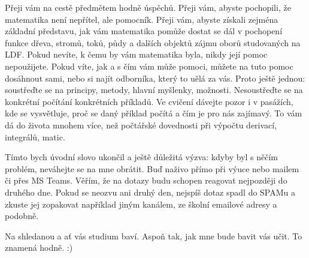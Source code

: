 \documentclass[12pt]{article}
\begin{document}
Přeji vám na cestě předmětem hodně úspěchů. Přeji vám, abyste pochopili, že matematika není nepřítel, ale pomocník. Přeji vám, abyste získali zejména základní představu, jak vám matematika pomůže dostat se dál v pochopení funkce dřeva, stromů, toků, půdy a dalších objektů zájmu oborů studovaných na LDF. Pokud nevíte, k čemu by vám matematika byla, nikdy její pomoc nepoužijete. Pokud víte, jak a s čím vám může pomoci, můžete na tuto pomoc dosáhnout sami, nebo si najít odborníka, který to uělá za vás. Proto ještě jednou: soustřeďte se na principy, metody, hlavní myšlenky, možnosti. Nesoustřeďte se na konkrétní počítání konkrétních příkladů. Ve cvičení dávejte pozor i v pasážích, kde se vysvětluje, proč se daný příklad počítá a čím je pro nás zajímavý. To vám dá do života mnohem více, než počtářské dovednosti při výpočtu derivací, integrálů, matic.

Tímto bych úvodní slovo ukončil a ještě důležitá výzva: kdyby byl s něčím problém, neváhejte se na mne obrátit. Buď naživo přímo při výuce nebo mailem či přes MS Teams. Věřím, že na dotazy budu schopen reagovat nejpozději do druhého dne. Pokud se neozvu ani druhý den, nejspíš dotaz spadl do SPAMu a zkuste jej zopakovat například jiným kanálem, ze školní emailové adresy a podobně.

Na shledanou a ať vás studium baví. Aspoň tak, jak mne bude bavit vás učit. To znamená hodně. :)
\end{document}
